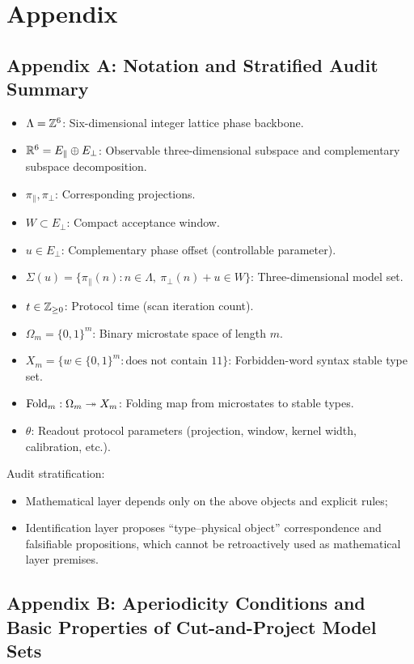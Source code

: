 \section{Appendix}

\subsection{Appendix A: Notation and Stratified Audit Summary}

\begin{itemize}
  \item $\Lambda=\mathbb{Z}^6$: Six-dimensional integer lattice phase backbone.
  \item $\mathbb{R}^6=E_{\parallel}\oplus E_{\perp}$: Observable three-dimensional subspace and complementary subspace decomposition.
  \item $\pi_{\parallel},\pi_{\perp}$: Corresponding projections.
  \item $W\subset E_{\perp}$: Compact acceptance window.
  \item $u\in E_{\perp}$: Complementary phase offset (controllable parameter).
  \item $\Sigma(u)=\{\pi_{\parallel}(n): n\in\Lambda,\ \pi_{\perp}(n)+u\in W\}$: Three-dimensional model set.
  \item $t\in\mathbb{Z}_{\ge 0}$: Protocol time (scan iteration count).
  \item $\Omega_m=\{0,1\}^m$: Binary microstate space of length $m$.
  \item $X_m=\{w\in\{0,1\}^m:\text{does not contain }11\}$: Forbidden-word syntax stable type set.
  \item $\mathrm{Fold}_m:\Omega_m\twoheadrightarrow X_m$: Folding map from microstates to stable types.
  \item $\theta$: Readout protocol parameters (projection, window, kernel width, calibration, etc.).
\end{itemize}

Audit stratification:
\begin{itemize}
  \item Mathematical layer depends only on the above objects and explicit rules;
  \item Identification layer proposes ``type--physical object'' correspondence and falsifiable propositions, which cannot be retroactively used as mathematical layer premises.
\end{itemize}

\subsection{Appendix B: Aperiodicity Conditions and Basic Properties of Cut-and-Project Model Sets}


